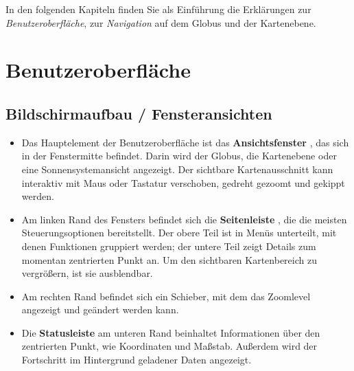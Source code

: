\documentclass[10pt]{scrreprt}
\newcommand{\textref}[1]{\mbox{\raisebox{0.1ex}{\small$\rightarrow$ }\textit{#1}}}
\begin{document}
\vspace{5mm}  
In den folgenden Kapiteln finden Sie als Einführung die Erklärungen zur \textref{Benutzeroberfläche}, zur \textref{Navigation} auf dem Globus und der Kartenebene.


\newpage
\section{Benutzeroberfläche}       
\vspace{3mm}
\subsection{Bildschirmaufbau / Fensteransichten}
\begin{itemize}
	\item Das Hauptelement der Benutzeroberfläche ist das \textbf{Ansichtsfenster}  , das sich in der Fenstermitte befindet. Darin wird der Globus, die Kartenebene oder eine Sonnensystemansicht angezeigt. Der sichtbare Kartenausschnitt kann interaktiv mit Maus oder Tastatur verschoben, gedreht gezoomt und gekippt werden.
	\item Am linken Rand des Fensters befindet sich die \textbf{Seitenleiste} , die die meisten Steuerungsoptionen bereitstellt. Der obere Teil ist in Menüs unterteilt, mit denen Funktionen gruppiert werden; der untere Teil zeigt Details zum momentan zentrierten Punkt an. Um den sichtbaren Kartenbereich zu vergrößern, ist sie ausblendbar.
	\item Am rechten Rand  befindet sich ein Schieber, mit dem das Zoomlevel angezeigt und geändert werden kann.
	\item Die \textbf{Statusleiste}  am unteren Rand beinhaltet Informationen über den zentrierten Punkt, wie Koordinaten und Maßstab. Außerdem wird der Fortschritt im Hintergrund geladener Daten angezeigt.
\end{itemize}
\end{document}
